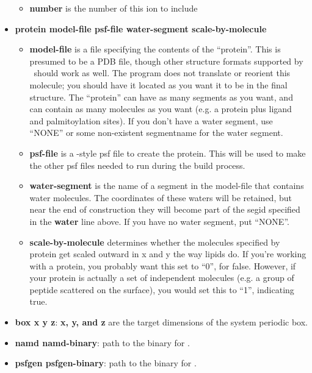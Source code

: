 \documentclass[12pt]{article}
\begin{document}
\begin{itemize}
\begin{itemize}
            \item {\bf number} is the number of this ion to include
          \end{itemize}
     \item {\bf protein model-file psf-file water-segment scale-by-molecule}
          \begin{itemize}
            \item {\bf model-file} is a file specifying the contents of the
            ``protein''.  This is presumed to be a PDB file, though other
            structure formats supported by \loos\ should work as well.  The
            program does not translate or reorient this molecule; you
            should have it located as you want it to be in the final
            structure.   The ``protein'' can have as many segments as you
            want, and can contain as many molecules as you want (e.g. a
            protein plus ligand and palmitoylation sites).  If you don't
            have a water segment, use ``NONE'' or some non-existent
            segmentname for the water segment.

            \item {\bf psf-file} is a \namd-style psf file to create the
            protein.  This will be used to make the other psf files needed
        to run {\namd} during the build process.  \item {\bf water-segment}
            is the name of a segment in the model-file that contains water
            molecules.  The coordinates of these waters will be retained,
            but near the end of construction they will become part of the
            segid specified in the {\bf water} line above.  If you have no
            water segment, put ``NONE''.

            \item{\bf scale-by-molecule} determines whether the molecules
                specified by protein get scaled outward in x and y the way
                lipids do.  If you're working with a protein, you probably
                want this set to ``0'', for false.  However, if your
                protein is actually a set of independent molecules (e.g. a
                group of peptide scattered on the surface), you would set
                this to ``1'', indicating true.

          \end{itemize}
     \item {\bf box x y z}: {\bf x, y, and z} are the target dimensions of the
            system periodic box.  
     \item {\bf namd namd-binary}: path to the binary for \namd.
     \item {\bf psfgen psfgen-binary}: path to the binary for \psfgen.

\end{itemize}
\end{document}
